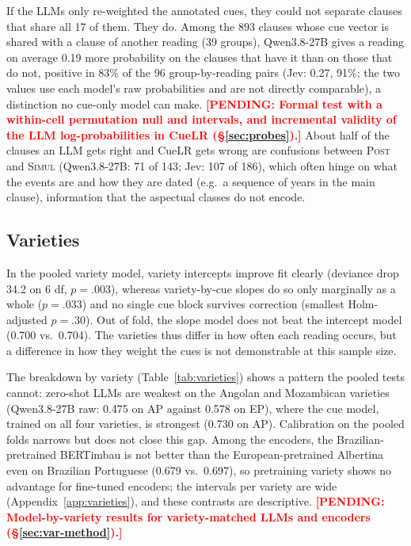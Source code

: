 \documentclass[11pt]{article}
\newcommand{\pending}[1]{\textcolor{red}{\textbf{[PENDING: #1]}}}
\begin{document}
If the LLMs only re-weighted the annotated cues, they could not separate clauses that share all 17 of them. They do. Among the 893 clauses whose cue vector is shared with a clause of another reading (39 groups), Qwen3.8-27B gives a reading on average 0.19 more probability on the clauses that have it than on those that do not, positive in 83\% of the 96 group-by-reading pairs (Jev: 0.27, 91\%; the two values use each model's raw probabilities and are not directly comparable), a distinction no cue-only model can make. \pending{Formal test with a within-cell permutation null and intervals, and incremental validity of the LLM log-probabilities in CueLR (\S\ref{sec:probes}).} About half of the clauses an LLM gets right and CueLR gets wrong are confusions between \textsc{Post} and \textsc{Simul} (Qwen3.8-27B: 71 of 143; Jev: 107 of 186), which often hinge on what the events are and how they are dated (e.g.\ a sequence of years in the main clause), information that the aspectual classes do not encode.

\subsection{Varieties}
\label{sec:varieties}
In the pooled variety model, variety intercepts improve fit clearly (deviance drop 34.2 on 6 df, $p = .003$), whereas variety-by-cue slopes do so only marginally as a whole ($p = .033$) and no single cue block survives correction (smallest Holm-adjusted $p = .30$). Out of fold, the slope model does not beat the intercept model (0.700 vs.\ 0.704). The varieties thus differ in how often each reading occurs, but a difference in how they weight the cues is not demonstrable at this sample size.

The breakdown by variety (Table~\ref{tab:varieties}) shows a pattern the pooled tests cannot: zero-shot LLMs are weakest on the Angolan and Mozambican varieties (Qwen3.8-27B raw: 0.475 on AP against 0.578 on EP), where the cue model, trained on all four varieties, is strongest (0.730 on AP). Calibration on the pooled folds narrows but does not close this gap. Among the encoders, the Brazilian-pretrained BERTimbau is not better than the European-pretrained Albertina even on Brazilian Portuguese (0.679 vs.\ 0.697), so pretraining variety shows no advantage for fine-tuned encoders; the intervals per variety are wide (Appendix~\ref{app:varieties}), and these contrasts are descriptive. \pending{Model-by-variety results for variety-matched LLMs and encoders (\S\ref{sec:var-method}).}
\end{document}
